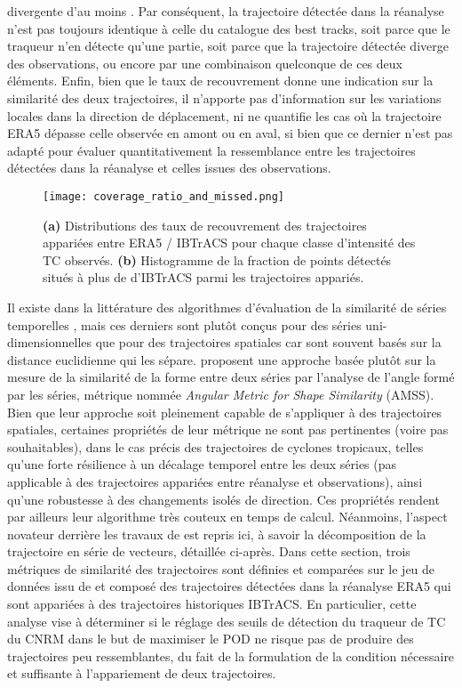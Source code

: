 \documentclass[../main.tex]{subfiles}
\begin{document}
divergente d'au moins . Par conséquent, la trajectoire détectée dans la réanalyse n'est pas toujours identique à celle du catalogue des best tracks,
soit parce que le traqueur n'en détecte qu'une partie, soit parce que la trajectoire détectée diverge des observations, ou encore par une combinaison quelconque
de ces deux éléments. Enfin, bien que le taux de recouvrement donne une indication sur la similarité des deux trajectoires, il n'apporte pas d'information sur
les variations locales dans la direction de déplacement, ni ne quantifie les cas où la trajectoire ERA5 dépasse celle observée en amont ou en aval, si bien que
ce dernier n'est pas adapté pour évaluer quantitativement la ressemblance entre les trajectoires détectées dans la réanalyse et celles issues des observations.

\begin{figure}[tb]
    \centering
    \texttt{[image: coverage\_ratio\_and\_missed.png]}
    \caption{\textbf{(a)} Distributions des taux de recouvrement des trajectoires appariées entre ERA5 / IBTrACS pour chaque classe d'intensité des TC observés.
    \textbf{(b)} Histogramme de la fraction de points détectés situés à plus de  d'IBTrACS parmi les trajectoires appariés.}
    \label{fig:coverage_ratio}
\end{figure}

Il existe dans la littérature des algorithmes d'évaluation de la similarité de séries temporelles
\parencite{faloutsos_fast_1994,das_finding_1997,frentzos_indexbased_2007}, mais ces derniers sont plutôt conçus pour des séries uni-dimensionnelles que pour des
trajectoires spatiales car sont souvent basés sur la distance euclidienne qui les sépare. \cite{nakamura_shapebased_2013} proposent une approche basée plutôt
sur la mesure de la similarité de la forme entre deux séries par l'analyse de l'angle formé par les séries, métrique nommée \textit{Angular Metric for Shape
Similarity} (AMSS). Bien que leur approche soit pleinement capable de s'appliquer à des trajectoires spatiales, certaines propriétés de leur métrique ne sont
pas pertinentes (voire pas souhaitables), dans le cas précis des trajectoires de cyclones tropicaux, telles qu'une forte résilience à un décalage temporel entre
les deux séries (pas applicable à des trajectoires appariées entre réanalyse et observations), ainsi qu'une robustesse à des changements isolés de direction.
Ces propriétés rendent par ailleurs leur algorithme très couteux en temps de calcul. Néanmoins, l'aspect novateur derrière les travaux de
\cite{nakamura_shapebased_2013} est repris ici, à savoir la décomposition de la trajectoire en série de vecteurs, détaillée ci-après. Dans cette section, trois
métriques de similarité des trajectoires sont définies et comparées sur le jeu de données issu de \cite{dulac_assessing_2023} et composé des trajectoires
détectées dans la réanalyse ERA5 qui sont appariées à des trajectoires historiques IBTrACS. En particulier, cette analyse vise à déterminer si le réglage des
seuils de détection du traqueur de TC du CNRM dans le but de maximiser le POD ne risque pas de produire des trajectoires peu ressemblantes, du fait de la
formulation de la condition nécessaire et suffisante à l'appariement de deux trajectoires.
\end{document}
